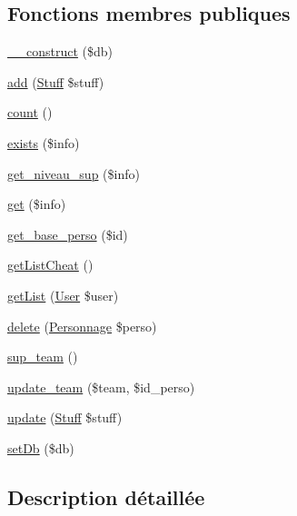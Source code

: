 \subsection*{Fonctions membres publiques}
\begin{DoxyCompactItemize}
\item 
\mbox{\hyperlink{class_stuff_manager_af5fbc1b8f8a8c6cb0463af793f97c807}{\+\_\+\+\_\+construct}} (\$db)
\item 
\mbox{\hyperlink{class_stuff_manager_ab754f0d8b6625898735779a852268223}{add}} (\mbox{\hyperlink{class_stuff}{Stuff}} \$stuff)
\item 
\mbox{\hyperlink{class_stuff_manager_a140ab5d594414d8a71b0c8cee976b8de}{count}} ()
\item 
\mbox{\hyperlink{class_stuff_manager_afc4490f2f57a541012ca5f66863b05fd}{exists}} (\$info)
\item 
\mbox{\hyperlink{class_stuff_manager_a399af828a28e5a36c7255ce7d8671f26}{get\+\_\+niveau\+\_\+sup}} (\$info)
\item 
\mbox{\hyperlink{class_stuff_manager_a4475df7ca91c484fb5140888b9d88b46}{get}} (\$info)
\item 
\mbox{\hyperlink{class_stuff_manager_a3cf88e6685c20da28e89ae03dd76943a}{get\+\_\+base\+\_\+perso}} (\$id)
\item 
\mbox{\hyperlink{class_stuff_manager_aa9af4cbbb54d6df257b5c61c9204d4bf}{get\+List\+Cheat}} ()
\item 
\mbox{\hyperlink{class_stuff_manager_a24643ff2a965eaf63cf467fb00107266}{get\+List}} (\mbox{\hyperlink{class_user}{User}} \$user)
\item 
\mbox{\hyperlink{class_stuff_manager_a22e7e650bbf0cdb20d1c0c0871c9613f}{delete}} (\mbox{\hyperlink{class_personnage}{Personnage}} \$perso)
\item 
\mbox{\hyperlink{class_stuff_manager_a157cb09a4f11da9cbf2ddf552a73f1b9}{sup\+\_\+team}} ()
\item 
\mbox{\hyperlink{class_stuff_manager_a4ec8aecb8d0e81fc8cb0409e290b95c5}{update\+\_\+team}} (\$team, \$id\+\_\+perso)
\item 
\mbox{\hyperlink{class_stuff_manager_a45dc81b0ddbbd804960d197d7a1cad69}{update}} (\mbox{\hyperlink{class_stuff}{Stuff}} \$stuff)
\item 
\mbox{\hyperlink{class_stuff_manager_a647de5fc08c6606300ca30937b7dde9e}{set\+Db}} (\$db)
\end{DoxyCompactItemize}


\subsection{Description détaillée}


